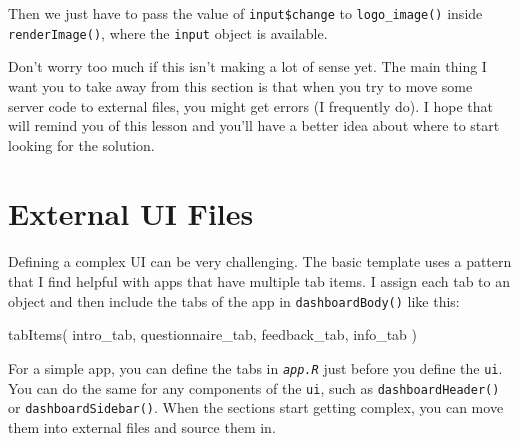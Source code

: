 \documentclass[
  oneside]{book}
\newenvironment{Shaded}{\begin{snugshade}}{\end{snugshade}}
\newcommand{\AttributeTok}[1]{\textcolor[rgb]{0.77,0.63,0.00}{#1}}
\newcommand{\ConstantTok}[1]{\textcolor[rgb]{0.00,0.00,0.00}{#1}}
\newcommand{\ControlFlowTok}[1]{\textcolor[rgb]{0.13,0.29,0.53}{\textbf{#1}}}
\newcommand{\FunctionTok}[1]{\textcolor[rgb]{0.00,0.00,0.00}{#1}}
\newcommand{\NormalTok}[1]{#1}
\newcommand{\OtherTok}[1]{\textcolor[rgb]{0.56,0.35,0.01}{#1}}
\newcommand{\SpecialCharTok}[1]{\textcolor[rgb]{0.00,0.00,0.00}{#1}}
\begin{document}
Then we just have to pass the value of \texttt{input\$change} to \texttt{logo\_image}\texttt{()} inside \texttt{renderImage}\texttt{()}, where the \texttt{input} object is available.

\begin{Shaded}
\end{Shaded}

Don't worry too much if this isn't making a lot of sense yet. The main thing I want you to take away from this section is that when you try to move some server code to external files, you might get errors (I frequently do). I hope that will remind you of this lesson and you'll have a better idea about where to start looking for the solution.

\hypertarget{external-ui-files}{%
\section{External UI Files}\label{external-ui-files}}

Defining a complex UI can be very challenging. The basic template uses a pattern that I find helpful with apps that have multiple tab items. I assign each tab to an object and then include the tabs of the app in \texttt{dashboardBody}\texttt{()} like this:

\begin{Shaded}
\begin{Highlighting}[]
\FunctionTok{tabItems}\NormalTok{(}
\NormalTok{    intro\_tab,}
\NormalTok{    questionnaire\_tab,}
\NormalTok{    feedback\_tab,}
\NormalTok{    info\_tab}
\NormalTok{)}
\end{Highlighting}
\end{Shaded}

For a simple app, you can define the tabs in \textit{\texttt{app.R}} just before you define the \texttt{ui}. You can do the same for any components of the \texttt{ui}, such as \texttt{dashboardHeader}\texttt{()} or \texttt{dashboardSidebar}\texttt{()}. When the sections start getting complex, you can move them into external files and source them in.
\end{document}
